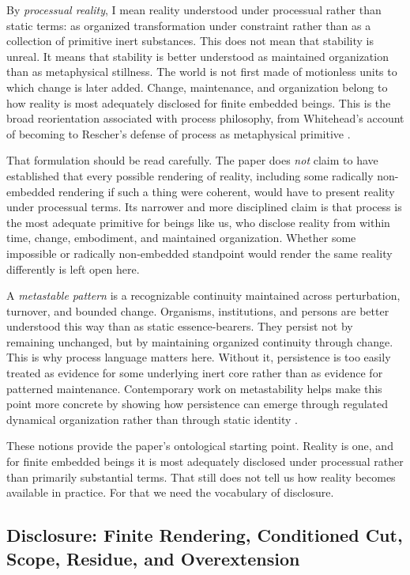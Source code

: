 \documentclass[11pt]{article}
\renewcommand{\emph}[1]{\textit{#1}}
\begin{document}
By \emph{processual reality}, I mean reality understood under processual rather than static terms: as organized transformation under constraint rather than as a collection of primitive inert substances. This does not mean that stability is unreal. It means that stability is better understood as maintained organization than as metaphysical stillness. The world is not first made of motionless units to which change is later added. Change, maintenance, and organization belong to how reality is most adequately disclosed for finite embedded beings. This is the broad reorientation associated with process philosophy, from Whitehead's account of becoming to Rescher's defense of process as metaphysical primitive \cite{Whitehead1978,Rescher1996}.

That formulation should be read carefully. The paper does \emph{not} claim to have established that every possible rendering of reality, including some radically non-embedded rendering if such a thing were coherent, would have to present reality under processual terms. Its narrower and more disciplined claim is that process is the most adequate primitive for beings like us, who disclose reality from within time, change, embodiment, and maintained organization. Whether some impossible or radically non-embedded standpoint would render the same reality differently is left open here.

A \emph{metastable pattern} is a recognizable continuity maintained across perturbation, turnover, and bounded change. Organisms, institutions, and persons are better understood this way than as static essence-bearers. They persist not by remaining unchanged, but by maintaining organized continuity through change. This is why process language matters here. Without it, persistence is too easily treated as evidence for some underlying inert core rather than as evidence for patterned maintenance. Contemporary work on metastability helps make this point more concrete by showing how persistence can emerge through regulated dynamical organization rather than through static identity \cite{TognoliKelso2014}.

These notions provide the paper's ontological starting point. Reality is one, and for finite embedded beings it is most adequately disclosed under processual rather than primarily substantial terms. That still does not tell us how reality becomes available in practice. For that we need the vocabulary of disclosure.

\subsection{Disclosure: Finite Rendering, Conditioned Cut, Scope, Residue, and Overextension}
\end{document}
